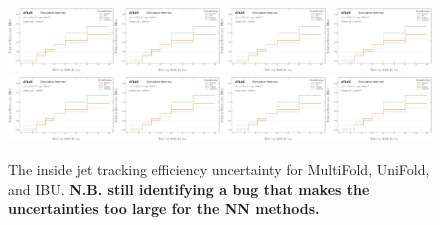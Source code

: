 \begin{figure}[h!]
\includegraphics[width=0.25\textwidth,page=66]{figures/SimResults/TrackJet_SystEffect.pdf}\includegraphics[width=0.25\textwidth,page=70]{figures/SimResults/TrackJet_SystEffect.pdf}\includegraphics[width=0.25\textwidth,page=74]{figures/SimResults/TrackJet_SystEffect.pdf}\includegraphics[width=0.25\textwidth,page=78]{figures/SimResults/TrackJet_SystEffect.pdf}\\
\includegraphics[width=0.25\textwidth,page=82]{figures/SimResults/TrackJet_SystEffect.pdf}\includegraphics[width=0.25\textwidth,page=86]{figures/SimResults/TrackJet_SystEffect.pdf}\includegraphics[width=0.25\textwidth,page=90]{figures/SimResults/TrackJet_SystEffect.pdf}\includegraphics[width=0.25\textwidth,page=94]{figures/SimResults/TrackJet_SystEffect.pdf}
\caption{The inside jet tracking efficiency uncertainty for MultiFold, UniFold, and IBU.  \textbf{N.B. still identifying a bug that makes the uncertainties too large for the NN methods.}}
\label{fig:simresultsmulti_trackjetuncertsl2}
\end{figure}

